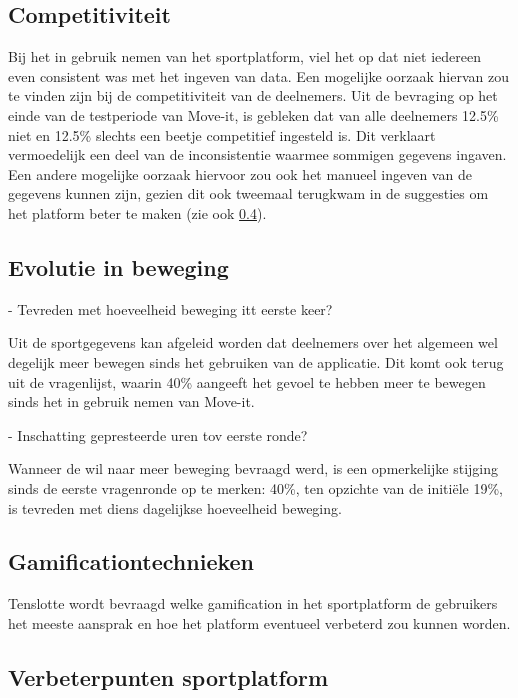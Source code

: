 \subsection{Competitiviteit}

Bij het in gebruik nemen van het sportplatform, viel het op dat niet iedereen even consistent was met het ingeven van data. Een mogelijke oorzaak hiervan zou te vinden zijn bij de competitiviteit van de deelnemers. Uit de bevraging op het einde van de testperiode van Move-it, is gebleken dat van alle deelnemers 12.5\% niet en 12.5\% slechts een beetje competitief ingesteld is. Dit verklaart vermoedelijk een deel van de inconsistentie waarmee sommigen gegevens ingaven.
Een andere mogelijke oorzaak hiervoor zou ook het manueel ingeven van de gegevens kunnen zijn, gezien dit ook tweemaal terugkwam in de suggesties om het platform beter te maken (zie ook \ref{ssec:verbeterpunten}).

\subsection{Evolutie in beweging}


- Tevreden met hoeveelheid beweging itt eerste keer?

Uit de sportgegevens kan afgeleid worden dat deelnemers over het algemeen wel degelijk meer bewegen sinds het gebruiken van de applicatie. Dit komt ook terug uit de vragenlijst, waarin 40\% aangeeft het gevoel te hebben meer te bewegen sinds het in gebruik nemen van Move-it.

- Inschatting gepresteerde uren tov eerste ronde?

Wanneer de wil naar meer beweging bevraagd werd, is een opmerkelijke stijging sinds de eerste vragenronde op te merken: 40\%, ten opzichte van de initiële 19\%, is tevreden met diens dagelijkse hoeveelheid beweging.

\subsection{Gamificationtechnieken}

Tenslotte wordt bevraagd welke gamification in het sportplatform de gebruikers het meeste aansprak en hoe het platform eventueel verbeterd zou kunnen worden.

\subsection{Verbeterpunten sportplatform}
\label{ssec:verbeterpunten}

